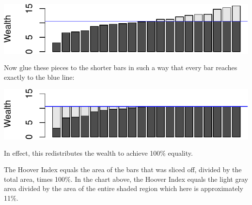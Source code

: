 \documentclass[12pt]{memoir}\usepackage[]{graphicx}\usepackage[table]{xcolor}
\begin{document}
\begin{center}
\includegraphics{figure/bar3-1.pdf}
\end{center}
Now glue these pieces to the shorter bars in such a way that every bar reaches exactly to 
the blue line:

\begin{center}
\includegraphics{figure/bar4-1.pdf}
\end{center}
In effect, this redistributes the wealth to achieve 100\%
equality. 

The Hoover Index equals the area of the bars that was sliced off, divided by the 
total area, times 100\%. In the chart above, the Hoover Index equals the 
light gray area divided by the area of the entire shaded region 
which here is approximately 11\%.  





\end{document}
